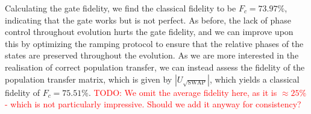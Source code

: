 \documentclass{subfiles}
\begin{document}
Calculating the gate fidelity, we find the classical fidelity to be $F_c = 73.97\%$, indicating that the gate works but is not perfect. As before, the lack of phase control throughout evolution hurts the gate fidelity, and we can improve upon this by optimizing the ramping protocol to ensure that the relative phases of the states are preserved throughout the evolution. As we are more interested in the realisation of correct population transfer, we can instead assess the fidelity of the population transfer matrix, which is given by $|U_{\sqrt{\text{SWAP}}}|$, which yields a classical fidelity of $F_c = 75.51\%$. \textcolor{red}{TODO: We omit the average fidelity here, as it is $\approx 25\%$ - which is not particularly impressive. Should we add it anyway for consistency?}
\end{document}
